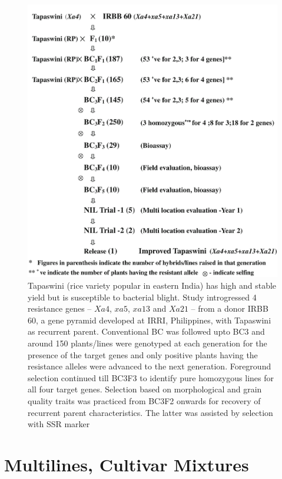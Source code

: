 \documentclass[11pt,dvipsnames,ignorenonframetext,aspectratio=169]{beamer}
\begin{document}
\begin{frame}{}
\protect\hypertarget{section-6}{}
\begin{figure}
\includegraphics[width=0.38\linewidth]{../images/gene_pyramiding_rice_blast} \caption{Tapaswini (rice variety popular in eastern India) has high and stable yield but is susceptible to bacterial blight. Study introgressed 4 resistance genes -- $Xa4$, $xa5$, $xa13$ and $Xa21$ -- from a donor IRBB 60, a gene pyramid developed at IRRI, Philippines, with Tapaswini as recurrent parent. Conventional BC was followed upto BC3 and around 150 plants/lines were genotyped at each generation for the presence of the target genes and only positive plants having the resistance alleles were advanced to the next generation. Foreground selection continued till BC3F3 to identify pure homozygous lines for all four target genes. Selection based on morphological and grain quality traits was practiced from BC3F2 onwards for recovery of recurrent parent characteristics. The latter was assisted by selection with SSR marker}\label{fig:gene-pyramiding-rice-blast}
\end{figure}
\end{frame}

\hypertarget{multilines-cultivar-mixtures}{%
\section{Multilines, Cultivar
Mixtures}\label{multilines-cultivar-mixtures}}
\end{document}
